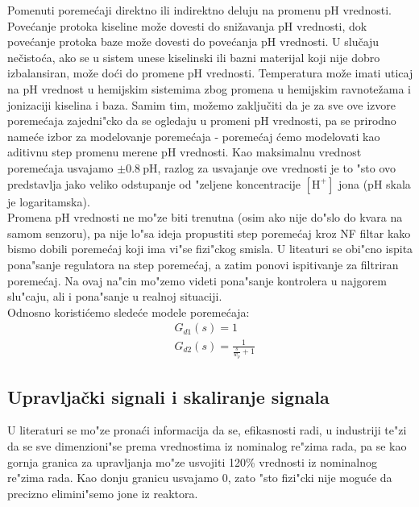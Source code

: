 \documentclass[a4paper,11pt]{article}
\theoremstyle{definition} \newtheorem{deff}{Definicija}[section]
\theoremstyle{definition} \newtheorem{prim}[deff]{Primer}
\theoremstyle{plain} \newtheorem{teor}[deff]{Teorema}
\begin{document}
	Pomenuti poremećaji direktno ili indirektno deluju na promenu pH vrednosti. Povećanje protoka kiseline može dovesti do snižavanja pH vrednosti, dok povećanje protoka baze može dovesti do povećanja pH vrednosti. U slučaju nečistoća, ako se u sistem unese kiselinski ili bazni materijal koji nije dobro izbalansiran, može doći do promene pH vrednosti. Temperatura može imati uticaj na pH vrednost u hemijskim sistemima zbog promena u hemijskim ravnotežama i jonizaciji kiselina i baza. Samim tim, možemo zaključiti da je za sve ove izvore poreme\'caja  zajedni"cko da se ogledaju u promeni pH vrednosti, pa se prirodno name\'ce izbor za modelovanje poreme\'caja - poreme\'caj \'cemo modelovati kao aditivnu step promenu merene pH vrednosti. Kao maksimalnu vrednost poreme\'caja usvajamo $\pm 0.8 ~ \text{pH}$, razlog za usvajanje ove vrednosti je to "sto ovo predstavlja jako veliko odstupanje od "zeljene koncentracije $[\text{H}^+]$ jona (pH skala je logaritamska). \\
	
	Promena pH vrednosti ne mo"ze biti trenutna (osim ako nije do"slo do kvara na samom senzoru), pa nije lo"sa ideja propustiti step poreme\'caj kroz NF filtar kako bismo dobili poreme\'caj koji ima vi"se fizi"ckog smisla. U liteaturi se obi"cno ispita pona"sanje regulatora na step poreme\'caj, a zatim ponovi ispitivanje za filtriran poreme\'caj. Na ovaj na"cin mo"zemo videti pona"sanje kontrolera u najgorem slu"caju, ali i pona"sanje u realnoj situaciji.\\
	
	\noindent Odnosno koristi\'cemo slede\'ce modele poreme\'caja: 
	\begin{align}
		&G_{d1}(s) = 1 \\
		&G_{d2}(s) = \frac{1}{\frac{s}{w_p} + 1}
	\end{align}
	
	
	
	\clearpage
	\subsection{Upravljački signali i skaliranje signala}
	
	U literaturi se mo"ze prona\'ci informacija da se, efikasnosti radi, u industriji te"zi da se sve dimenzioni"se prema vrednostima iz nominalog re"zima rada, pa se kao gornja granica za upravljanja mo"ze usvojiti 120\% vrednosti iz nominalnog re"zima rada. Kao donju granicu usvajamo 0, zato "sto fizi"cki nije mogu\'ce da precizno elimini"semo jone iz reaktora.\\ 
	
\end{document}
